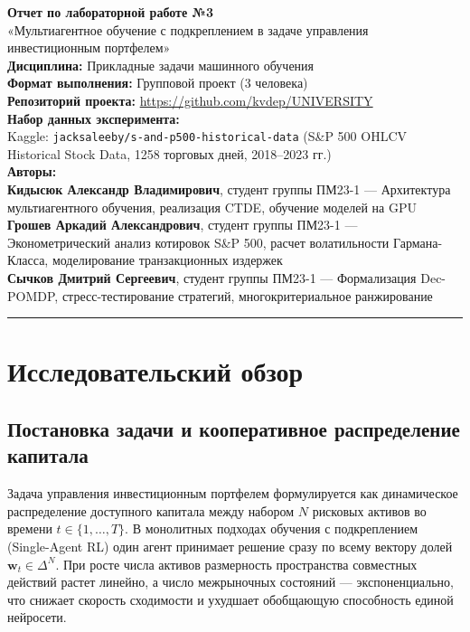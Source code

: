 \documentclass[11pt,a4paper]{article}
\begin{document}
\begin{center}
{\Large\bfseries Отчет по лабораторной работе №3}\\[6pt]
{\large «Мультиагентное обучение с подкреплением в задаче управления инвестиционным портфелем»}\\[8pt]
\textbf{Дисциплина:} Прикладные задачи машинного обучения\\[2pt]
\textbf{Формат выполнения:} Групповой проект (3 человека)\\[2pt]
\textbf{Репозиторий проекта:} \url{https://github.com/kvdep/UNIVERSITY}\\[4pt]
\textbf{Набор данных эксперимента:}\\
Kaggle: \texttt{jacksaleeby/s-and-p500-historical-data} (S\&P 500 OHLCV Historical Stock Data, 1258 торговых дней, 2018--2023 гг.)\\[6pt]
\textbf{Авторы:}\\
\textbf{Кидысюк Александр Владимирович}, студент группы ПМ23-1 --- Архитектура мультиагентного обучения, реализация CTDE, обучение моделей на GPU\\
\textbf{Грошев Аркадий Александрович}, студент группы ПМ23-1 --- Эконометрический анализ котировок S\&P 500, расчет волатильности Гармана-Класса, моделирование транзакционных издержек\\
\textbf{Сычков Дмитрий Сергеевич}, студент группы ПМ23-1 --- Формализация Dec-POMDP, стресс-тестирование стратегий, многокритериальное ранжирование
\end{center}

\vspace{0.8em}
\hrule
\vspace{0.8em}

\section{Исследовательский обзор}

\subsection{Постановка задачи и кооперативное распределение капитала}

Задача управления инвестиционным портфелем формулируется как динамическое распределение доступного капитала между набором $N$ рисковых активов во времени $t \in \{1, \dots, T\}$. В монолитных подходах обучения с подкреплением (Single-Agent RL) один агент принимает решение сразу по всему вектору долей $\mathbf{w}_t \in \Delta^N$. При росте числа активов размерность пространства совместных действий растет линейно, а число межрыночных состояний --- экспоненциально, что снижает скорость сходимости и ухудшает обобщающую способность единой нейросети.
\end{document}
